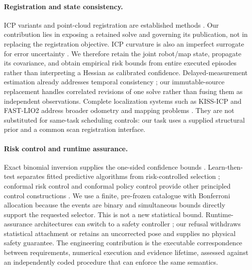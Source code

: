 \paragraph{Registration and state consistency.}
ICP variants and point-cloud registration are established methods \cite{besl1992icp,chen1992,segal2009gicp,pomerleau2015}. Our contribution lies in exposing a retained solve and governing its publication, not in replacing the registration objective. ICP curvature is also an imperfect surrogate for error uncertainty \cite{censi2007,bonnabel2016,brossard2020}. We therefore retain the joint robot/map state, propagate its covariance, and obtain empirical risk bounds from entire executed episodes rather than interpreting a Hessian as calibrated confidence. Delayed-measurement estimation already addresses temporal consistency \cite{barshalom2002}; our immutable-source replacement handles correlated revisions of one solve rather than fusing them as independent observations. Complete localization systems such as KISS-ICP and FAST-LIO2 address broader odometry and mapping problems \cite{kiss2023,xu2022}. They are not substituted for same-task scheduling controls: our task uses a supplied structural prior and a common scan registration interface.

\paragraph{Risk control and runtime assurance.}
Exact binomial inversion supplies the one-sided confidence bounds \cite{clopper1934}. Learn-then-test separates fitted predictive algorithms from risk-controlled selection \cite{angelopoulos2025ltt}; conformal risk control and conformal policy control provide other principled control constructions \cite{angelopoulos2024crc,prinster2026}. We use a finite, pre-frozen catalogue with Bonferroni allocation because the events are binary and simultaneous bounds directly support the requested selector. This is not a new statistical bound. Runtime-assurance architectures can switch to a safety controller \cite{mehmood2022simplex}; our refusal withdraws statistical attachment or retains an uncorrected pose and supplies no physical safety guarantee. The engineering contribution is the executable correspondence between requirements, numerical execution and evidence lifetime, assessed against an independently coded procedure that can enforce the same semantics.

